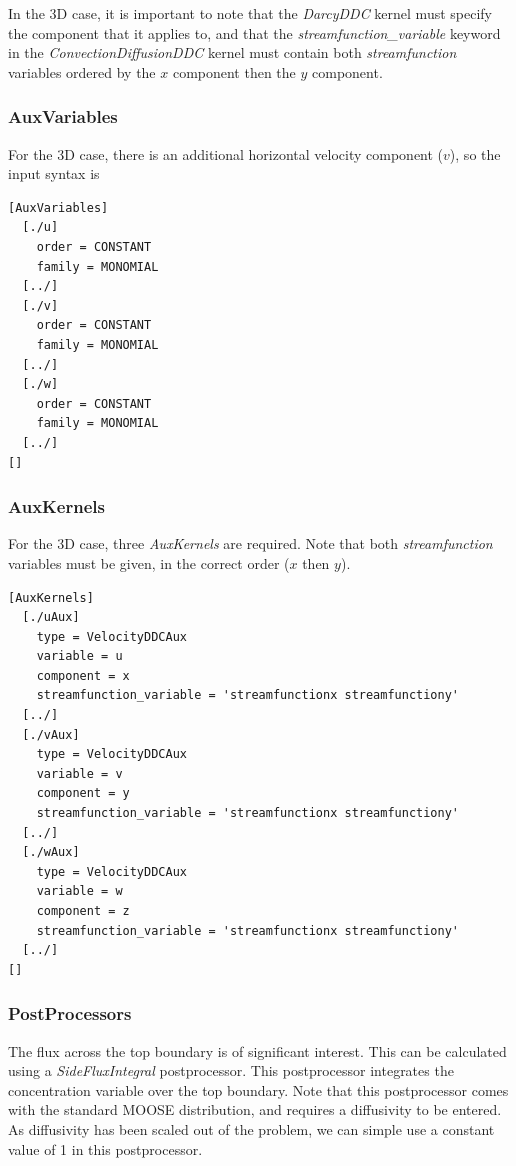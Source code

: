 \documentclass[11pt, a4paper]{csiroreport2012}
\begin{document}
In the 3D case, it is important to note that the \emph{DarcyDDC} kernel must specify the component that it applies to, and that the \emph{streamfunction\_variable} keyword in the \emph{ConvectionDiffusionDDC} kernel must contain both \emph{streamfunction} variables ordered by the $x$ component then the $y$ component.

\subsubsection*{AuxVariables}

For the 3D case, there is an additional horizontal velocity component ($v$), so the input syntax is
\begin{shaded}
\begin{verbatim}
[AuxVariables]
  [./u]
    order = CONSTANT
    family = MONOMIAL
  [../]
  [./v]
    order = CONSTANT
    family = MONOMIAL
  [../]
  [./w]
    order = CONSTANT
    family = MONOMIAL
  [../]
[]
\end{verbatim}
\end{shaded}

\subsubsection*{AuxKernels}

For the 3D case, three \emph{AuxKernels} are required. Note that both \emph{streamfunction} variables must be given, in the correct order ($x$ then $y$). 
\begin{shaded}
\begin{verbatim}
[AuxKernels]
  [./uAux]
    type = VelocityDDCAux
    variable = u
    component = x
    streamfunction_variable = 'streamfunctionx streamfunctiony'
  [../]
  [./vAux]
    type = VelocityDDCAux
    variable = v
    component = y
    streamfunction_variable = 'streamfunctionx streamfunctiony'
  [../]
  [./wAux]
    type = VelocityDDCAux
    variable = w
    component = z
    streamfunction_variable = 'streamfunctionx streamfunctiony'
  [../]
[]
\end{verbatim}
\end{shaded}

\subsubsection*{PostProcessors}

The flux across the top boundary is of significant interest. This can be calculated using a \emph{SideFluxIntegral} postprocessor. This postprocessor integrates the concentration variable over the top boundary. Note that this postprocessor comes with the standard MOOSE distribution, and requires a diffusivity to be entered. As diffusivity has been scaled out of the problem, we can simple use a constant value of 1 in this postprocessor.
\end{document}
